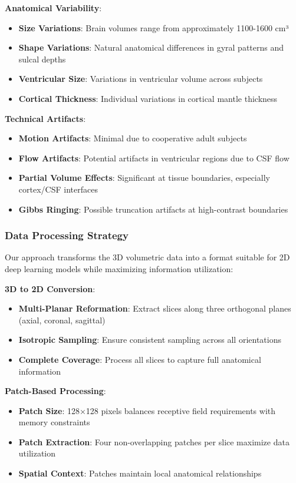 \documentclass[12pt,a4paper]{article}
\begin{document}
\textbf{Anatomical Variability}:
\begin{itemize}
    \item \textbf{Size Variations}: Brain volumes range from approximately 1100-1600 cm³
    \item \textbf{Shape Variations}: Natural anatomical differences in gyral patterns and sulcal depths
    \item \textbf{Ventricular Size}: Variations in ventricular volume across subjects
    \item \textbf{Cortical Thickness}: Individual variations in cortical mantle thickness
\end{itemize}

\textbf{Technical Artifacts}:
\begin{itemize}
    \item \textbf{Motion Artifacts}: Minimal due to cooperative adult subjects
    \item \textbf{Flow Artifacts}: Potential artifacts in ventricular regions due to CSF flow
    \item \textbf{Partial Volume Effects}: Significant at tissue boundaries, especially cortex/CSF interfaces
    \item \textbf{Gibbs Ringing}: Possible truncation artifacts at high-contrast boundaries
\end{itemize}

\subsubsection{Data Processing Strategy}

Our approach transforms the 3D volumetric data into a format suitable for 2D deep learning models while maximizing information utilization:

\textbf{3D to 2D Conversion}:
\begin{itemize}
    \item \textbf{Multi-Planar Reformation}: Extract slices along three orthogonal planes (axial, coronal, sagittal)
    \item \textbf{Isotropic Sampling}: Ensure consistent sampling across all orientations
    \item \textbf{Complete Coverage}: Process all slices to capture full anatomical information
\end{itemize}

\textbf{Patch-Based Processing}:
\begin{itemize}
    \item \textbf{Patch Size}: 128×128 pixels balances receptive field requirements with memory constraints
    \item \textbf{Patch Extraction}: Four non-overlapping patches per slice maximize data utilization
    \item \textbf{Spatial Context}: Patches maintain local anatomical relationships
\end{itemize}
\end{document}
